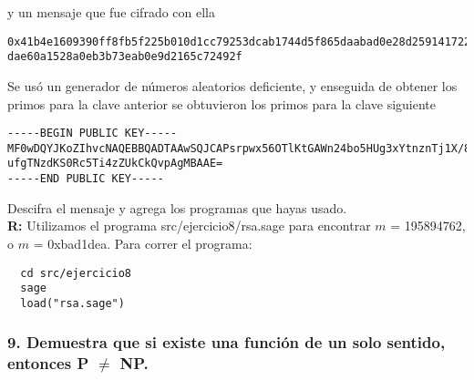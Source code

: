 \documentclass[14pt]{article}
\begin{document}
y un mensaje que fue cifrado con ella

\begin{verbatim}
0x41b4e1609390ff8fb5f225b010d1cc79253dcab1744d5f865daabad0e28d259141722382114d9a73106b4d429676
dae60a1528a0eb3b73eab0e9d2165c72492f
\end{verbatim}
Se usó un generador de números aleatorios deficiente, y enseguida de obtener los primos para la clave anterior se obtuvieron los primos para la clave siguiente

\begin{verbatim}
-----BEGIN PUBLIC KEY-----
MF0wDQYJKoZIhvcNAQEBBQADTAAwSQJCAPsrpwx56OTlKtGAWn24bo5HUg3xYtnznTj1X/8Hq7pLYNIVE57Yxoyr3zTOOBJ
ufgTNzdKS0Rc5Ti4zZUkCkQvpAgMBAAE=
-----END PUBLIC KEY-----
\end{verbatim}

Descifra el mensaje y agrega los programas que hayas usado. \\

\textbf{R:} Utilizamos el programa \textsf{src/ejercicio8/rsa.sage} para encontrar $m$ = 195894762, o $m$ = 0xbad1dea. Para correr el programa:
\begin{verbatim}
  cd src/ejercicio8
  sage
  load("rsa.sage")
\end{verbatim}

\subsubsection*{9. Demuestra que si existe una función de un solo sentido, entonces P $\neq$ NP.}
\end{document}
